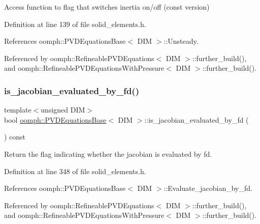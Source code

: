 Access function to flag that switches inertia on/off (const version) 



Definition at line 139 of file solid\+\_\+elements.\+h.



References oomph\+::\+P\+V\+D\+Equations\+Base$<$ D\+I\+M $>$\+::\+Unsteady.



Referenced by oomph\+::\+Refineable\+P\+V\+D\+Equations$<$ D\+I\+M $>$\+::further\+\_\+build(), and oomph\+::\+Refineable\+P\+V\+D\+Equations\+With\+Pressure$<$ D\+I\+M $>$\+::further\+\_\+build().

\mbox{\label{classoomph_1_1PVDEquationsBase_a3549cf43c725bf6742ee5a62c0016f1c}} 
\subsubsection{\texorpdfstring{is\+\_\+jacobian\+\_\+evaluated\+\_\+by\+\_\+fd()}{is\_jacobian\_evaluated\_by\_fd()}}
{\footnotesize\ttfamily template$<$unsigned D\+IM$>$ \\
bool \hyperlink{classoomph_1_1PVDEquationsBase}{oomph\+::\+P\+V\+D\+Equations\+Base}$<$ D\+IM $>$\+::is\+\_\+jacobian\+\_\+evaluated\+\_\+by\+\_\+fd (\begin{DoxyParamCaption}{ }\end{DoxyParamCaption}) const\hspace{0.3cm}{\ttfamily [inline]}}



Return the flag indicating whether the jacobian is evaluated by fd. 



Definition at line 348 of file solid\+\_\+elements.\+h.



References oomph\+::\+P\+V\+D\+Equations\+Base$<$ D\+I\+M $>$\+::\+Evaluate\+\_\+jacobian\+\_\+by\+\_\+fd.



Referenced by oomph\+::\+Refineable\+P\+V\+D\+Equations$<$ D\+I\+M $>$\+::further\+\_\+build(), and oomph\+::\+Refineable\+P\+V\+D\+Equations\+With\+Pressure$<$ D\+I\+M $>$\+::further\+\_\+build().

